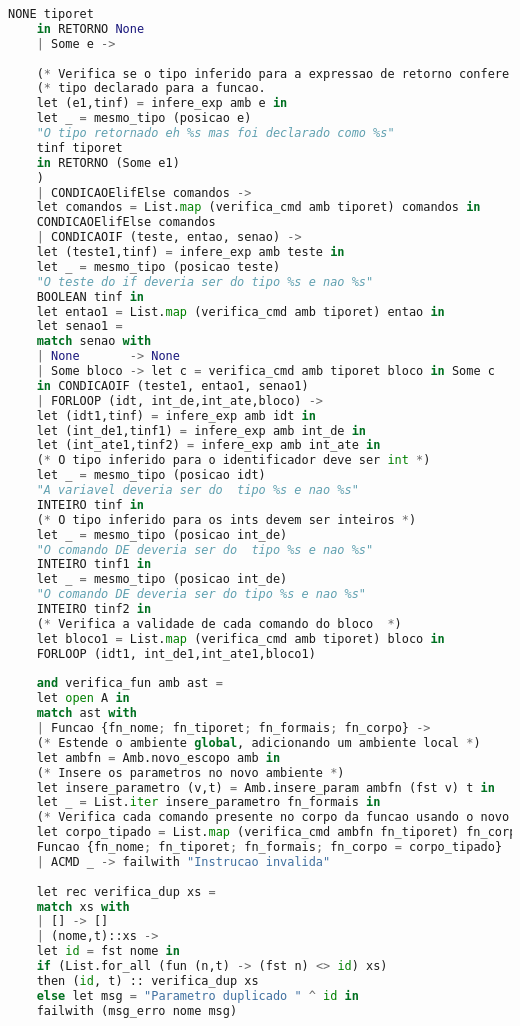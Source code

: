 \documentclass[hidelinks,12pt]{article}
\begin{document}
\begin{appendices}
\begin{lstlisting}[caption=semantico.mll, language=python]
	NONE tiporet
	in RETORNO None
	| Some e ->
	
	(* Verifica se o tipo inferido para a expressao de retorno confere com o *)
	(* tipo declarado para a funcao.                                         *)
	let (e1,tinf) = infere_exp amb e in
	let _ = mesmo_tipo (posicao e)
	"O tipo retornado eh %s mas foi declarado como %s"
	tinf tiporet
	in RETORNO (Some e1)
	)
	| CONDICAOElifElse comandos ->
	let comandos = List.map (verifica_cmd amb tiporet) comandos in
	CONDICAOElifElse comandos
	| CONDICAOIF (teste, entao, senao) ->
	let (teste1,tinf) = infere_exp amb teste in
	let _ = mesmo_tipo (posicao teste)
	"O teste do if deveria ser do tipo %s e nao %s"
	BOOLEAN tinf in
	let entao1 = List.map (verifica_cmd amb tiporet) entao in
	let senao1 =
	match senao with
	| None       -> None
	| Some bloco -> let c = verifica_cmd amb tiporet bloco in Some c
	in CONDICAOIF (teste1, entao1, senao1)
	| FORLOOP (idt, int_de,int_ate,bloco) ->
	let (idt1,tinf) = infere_exp amb idt in
	let (int_de1,tinf1) = infere_exp amb int_de in
	let (int_ate1,tinf2) = infere_exp amb int_ate in
	(* O tipo inferido para o identificador deve ser int *)
	let _ = mesmo_tipo (posicao idt)
	"A variavel deveria ser do  tipo %s e nao %s"
	INTEIRO tinf in
	(* O tipo inferido para os ints devem ser inteiros *)
	let _ = mesmo_tipo (posicao int_de)
	"O comando DE deveria ser do  tipo %s e nao %s"
	INTEIRO tinf1 in
	let _ = mesmo_tipo (posicao int_de)
	"O comando DE deveria ser do tipo %s e nao %s"
	INTEIRO tinf2 in
	(* Verifica a validade de cada comando do bloco  *)
	let bloco1 = List.map (verifica_cmd amb tiporet) bloco in
	FORLOOP (idt1, int_de1,int_ate1,bloco1)
	
	and verifica_fun amb ast =
	let open A in
	match ast with
	| Funcao {fn_nome; fn_tiporet; fn_formais; fn_corpo} ->
	(* Estende o ambiente global, adicionando um ambiente local *)
	let ambfn = Amb.novo_escopo amb in
	(* Insere os parametros no novo ambiente *)
	let insere_parametro (v,t) = Amb.insere_param ambfn (fst v) t in
	let _ = List.iter insere_parametro fn_formais in
	(* Verifica cada comando presente no corpo da funcao usando o novo ambiente *)
	let corpo_tipado = List.map (verifica_cmd ambfn fn_tiporet) fn_corpo in
	Funcao {fn_nome; fn_tiporet; fn_formais; fn_corpo = corpo_tipado}
	| ACMD _ -> failwith "Instrucao invalida"
	
	let rec verifica_dup xs =
	match xs with
	| [] -> []
	| (nome,t)::xs ->
	let id = fst nome in
	if (List.for_all (fun (n,t) -> (fst n) <> id) xs)
	then (id, t) :: verifica_dup xs
	else let msg = "Parametro duplicado " ^ id in
	failwith (msg_erro nome msg)
	

\end{lstlisting}
\end{appendices}
\end{document}
